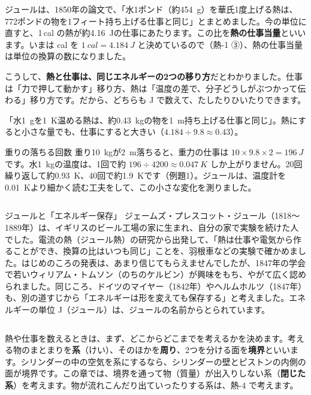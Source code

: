 ジュールは、1850年の論文で、「水1ポンド（約\qty{454}{g}）を華氏1度上げる熱は、772ポンドの物を1フィート持ち上げる仕事と同じ」とまとめました。今の単位に直すと、1\,cal の熱が約\qty{4.16}{J}の仕事にあたります。この比を\textbf{熱の仕事当量}といいます。いまは cal を $\qty{1}{cal}=\qty{4.184}{J}$ と決めているので（熱-1 ③）、熱の仕事当量は単位の換算の数になりました。

\label{ph:熱-2:joule}こうして、\textbf{熱と仕事は、同じエネルギーの2つの移り方}だとわかりました。仕事は「力で押して動かす」移り方、熱は「温度の差で、分子どうしがぶつかって伝わる」移り方です。だから、どちらも J で数えて、たしたりひいたりできます。

\begin{phyomi}[熱の仕事当量 $\qty{1}{cal}=\qty{4.184}{J}$]
「水\qty{1}{g}を\qty{1}{K}温める熱は、約\qty{0.43}{kg}の物を\qty{1}{m}持ち上げる仕事と同じ」。熱にすると小さな量でも、仕事にすると大きい（$4.184\div9.8\approx0.43$）。
\end{phyomi}

\begin{phbaisuru}{重りの落ちる回数}
重り\qty{10}{kg}が\qty{2}{m}落ちると、重力の仕事は $10\times9.8\times2=\qty{196}{J}$ です。水\qty{1}{kg}の温度は、1回で約 $196\div4200\approx\qty{0.047}{K}$ しか上がりません。20回繰り返して約\qty{0.93}{K}、40回で約\qty{1.9}{K}です（例題1）。ジュールは、温度計を\qty{0.01}{K}より細かく読む工夫をして、この小さな変化を測りました。
\end{phbaisuru}

\begin{column}{ジュールと「エネルギー保存」}
ジェームズ・プレスコット・ジュール（1818〜1889年）は、イギリスのビール工場の家に生まれ、自分の家で実験を続けた人でした。電流の熱（ジュール熱）の研究から出発して、「熱は仕事や電気から作ることができ、換算の比はいつも同じ」ことを、羽根車などの実験で確かめました。はじめのころの発表は、あまり信じてもらえませんでしたが、1847年の学会で若いウィリアム・トムソン（のちのケルビン）が興味をもち、やがて広く認められました。同じころ、ドイツのマイヤー（1842年）やヘルムホルツ（1847年）も、別の道すじから「エネルギーは形を変えても保存する」と考えました。エネルギーの単位 J（ジュール）は、ジュールの名前からとられています。
\end{column}

\label{ph:熱-2:sec2}
熱や仕事を数えるときは、まず、どこからどこまでを考えるかを決めます。考える物のまとまりを\textbf{系}（けい）、そのほかを\textbf{周り}、2つを分ける面を\textbf{境界}といいます。シリンダーの中の空気を系にするなら、シリンダーの壁とピストンの内側の面が境界です。この章では、境界を通って物（質量）が出入りしない系（\textbf{閉じた系}）を考えます。物が流れこんだり出ていったりする系は、熱-4 で考えます。

